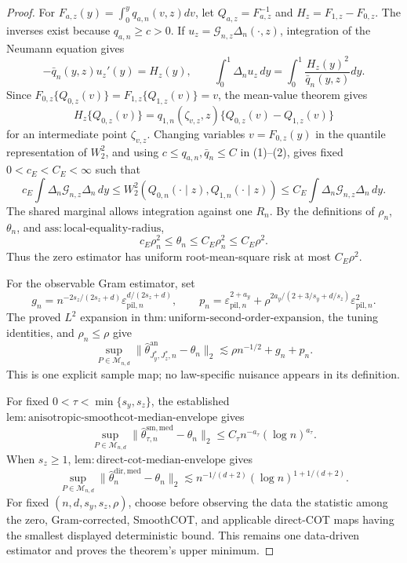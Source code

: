 \documentclass{article}
\begin{document}
\begin{proof}
For \(F_{a,z}(y)=\int_0^yq_{a,n}(v,z)dv\), let \(Q_{a,z}=F_{a,z}^{-1}\) and \(H_z=F_{1,z}-F_{0,z}\). The inverses exist because \(q_{a,n}\ge c>0\). If \(u_z=\mathcal G_{n,z}\Delta_n(\cdot,z)\), integration of the Neumann equation gives
\[
-\bar q_n(y,z)u_z'(y)=H_z(y),
\qquad
\int_0^1\Delta_nu_z\,dy=\int_0^1\frac{H_z(y)^2}{\bar q_n(y,z)}dy. \tag{1}
\]
Since \(F_{0,z}\{Q_{0,z}(v)\}=F_{1,z}\{Q_{1,z}(v)\}=v\), the mean-value theorem gives
\[
H_z\{Q_{0,z}(v)\}
=q_{1,n}(\zeta_{v,z},z)\{Q_{0,z}(v)-Q_{1,z}(v)\}                \tag{2}
\]
for an intermediate point \(\zeta_{v,z}\). Changing variables \(v=F_{0,z}(y)\) in the quantile representation of \(W_2^2\), and using \(c\le q_{a,n},\bar q_n\le C\) in (1)--(2), gives fixed \(0<c_E<C_E<\infty\) such that
\[
c_E\int\Delta_n\mathcal G_{n,z}\Delta_n\,dy
\le W_2^2(Q_{0,n}(\cdot\mid z),Q_{1,n}(\cdot\mid z))
\le C_E\int\Delta_n\mathcal G_{n,z}\Delta_n\,dy.              \tag{3}
\]
The shared marginal allows integration against one \(R_n\). By the definitions of \(\rho_n\), \(\theta_n\), and \(\mathrm{ass{:}local\text{-}equality\text{-}radius}\),
\[
c_E\rho_n^2\le\theta_n\le C_E\rho_n^2\le C_E\rho^2.           \tag{4}
\]
Thus the zero estimator has uniform root-mean-square risk at most \(C_E\rho^2\).

For the observable Gram estimator, set
\[
g_n=n^{-2s_z/(2s_z+d)}\varepsilon_{\mathrm{pil},n}^{d/(2s_z+d)},
\qquad
p_n=\varepsilon_{\mathrm{pil},n}^{2+a_y}
+\rho^{2a_y/(2+3/s_y+d/s_z)}\varepsilon_{\mathrm{pil},n}^2.
\]
The proved \(L^2\) expansion in \(\mathrm{thm{:}uniform\text{-}second\text{-}order\text{-}expansion}\), the tuning identities, and \(\rho_n\le\rho\) give
\[
\sup_{P\in\mathcal M_{n,d}}
\|\widehat\theta^{\mathrm{an}}_{J_y^*,J_z^*,n}-\theta_n\|_2
\lesssim\rho n^{-1/2}+g_n+p_n.                                 \tag{5}
\]
This is one explicit sample map; no law-specific nuisance appears in its definition.

For fixed \(0<\tau<\min\{s_y,s_z\}\), the established \(\mathrm{lem{:}anisotropic\text{-}smoothcot\text{-}median\text{-}envelope}\) gives
\[
\sup_{P\in\mathcal M_{n,d}}
\|\widehat\theta^{\mathrm{sm,med}}_{\tau,n}-\theta_n\|_2
\le C_\tau n^{-a_\tau}(\log n)^{a_\tau}.                       \tag{6}
\]
When \(s_z\ge1\), \(\mathrm{lem{:}direct\text{-}cot\text{-}median\text{-}envelope}\) gives
\[
\sup_{P\in\mathcal M_{n,d}}
\|\widehat\theta_n^{\mathrm{dir,med}}-\theta_n\|_2
\lesssim n^{-1/(d+2)}(\log n)^{1+1/(d+2)}.                      \tag{7}
\]
For fixed \((n,d,s_y,s_z,\rho)\), choose before observing the data the statistic among the zero, Gram-corrected, SmoothCOT, and applicable direct-COT maps having the smallest displayed deterministic bound. This remains one data-driven estimator and proves the theorem's upper minimum.


\end{proof}
\end{document}
